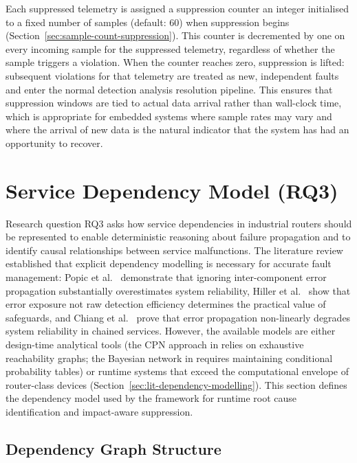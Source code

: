 Each suppressed telemetry is assigned a suppression counter an integer initialised to a fixed number of samples (default: 60) when suppression begins (Section~\ref{sec:sample-count-suppression}). This counter is decremented by one on every incoming sample for the suppressed telemetry, regardless of whether the sample triggers a violation. When the counter reaches zero, suppression is lifted: subsequent violations for that telemetry are treated as new, independent faults and enter the normal detection analysis resolution pipeline. This ensures that suppression windows are tied to actual data arrival rather than wall-clock time, which is appropriate for embedded systems where sample rates may vary and where the arrival of new data is the natural indicator that the system has had an opportunity to recover.

\section{Service Dependency Model (RQ3)}\label{sec:dependency-model}

Research question RQ3 asks how service dependencies in industrial routers should be represented to enable deterministic reasoning about failure propagation and to identify causal relationships between service malfunctions. The literature review established that explicit dependency modelling is necessary for accurate fault management: Popic et al.\ \cite{ref7} demonstrate that ignoring inter-component error propagation substantially overestimates system reliability, Hiller et al.\ \cite{ref8} show that error exposure not raw detection efficiency determines the practical value of safeguards, and Chiang et al.\ \cite{ref9} prove that error propagation non-linearly degrades system reliability in chained services. However, the available models are either design-time analytical tools (the CPN approach in \cite{ref10} relies on exhaustive reachability graphs; the Bayesian network in \cite{ref12} requires maintaining conditional probability tables) or runtime systems that exceed the computational envelope of router-class devices (Section~\ref{sec:lit-dependency-modelling}). This section defines the dependency model used by the framework for runtime root cause identification and impact-aware suppression.

\subsection{Dependency Graph Structure}\label{sec:dependency-graph-structure}

